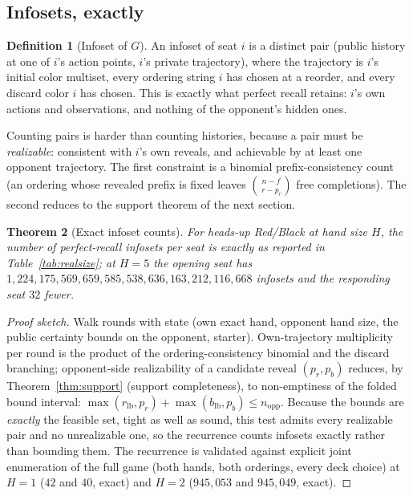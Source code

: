 \documentclass[11pt]{article}
\theoremstyle{plain}
\newtheorem{theorem}{Theorem}[section]
\theoremstyle{definition}
\newtheorem{definition}[theorem]{Definition}
\theoremstyle{remark}
\newcommand{\rlb}{\ensuremath{r_{\mathrm{lb}}}}
\newcommand{\blb}{\ensuremath{b_{\mathrm{lb}}}}
\begin{document}
\subsection{Infosets, exactly}

\begin{definition}[Infoset of $G$]\label{def:infoset}
An infoset of seat $i$ is a distinct pair (public history at one of $i$'s
action points, $i$'s private trajectory), where the trajectory is $i$'s
initial color multiset, every ordering string $i$ has chosen at a reorder,
and every discard color $i$ has chosen. This is exactly what perfect recall
retains: $i$'s own actions and observations, and nothing of the
opponent's hidden ones.
\end{definition}

Counting pairs is harder than counting histories, because a pair must be
\emph{realizable}: consistent with $i$'s own reveals, and achievable by at
least one opponent trajectory. The first constraint is a binomial
prefix-consistency count (an ordering whose revealed prefix is fixed leaves
$\binom{n-f}{\,r-p_r}$ free completions). The second reduces to the support
theorem of the next section.

\begin{theorem}[Exact infoset counts]\label{thm:infosets}
For heads-up Red/Black at hand size $H$, the number of perfect-recall
infosets per seat is exactly as reported in Table~\ref{tab:realsize}; at
$H=5$ the opening seat has
$1{,}224{,}175{,}569{,}659{,}585{,}538{,}636{,}163{,}212{,}116{,}668$
infosets and the responding seat $32$ fewer.
\end{theorem}

\begin{proof}[Proof sketch]
Walk rounds with state (own exact hand, opponent hand size, the public
certainty bounds on the opponent, starter). Own-trajectory multiplicity
per round is the product of the ordering-consistency binomial and the
discard branching; opponent-side realizability of a candidate reveal
$(p_r,p_b)$ reduces, by Theorem~\ref{thm:support} (support completeness),
to non-emptiness of the folded bound interval:
$\max(\rlb,p_r)+\max(\blb,p_b)\le n_{\mathrm{opp}}$. Because the bounds
are \emph{exactly} the feasible set, tight as well as sound, this test
admits every realizable pair and no unrealizable one, so the recurrence
counts infosets exactly rather than bounding them. The recurrence is
validated against explicit joint enumeration of the full game (both hands,
both orderings, every deck choice) at $H=1$ ($42$ and $40$, exact) and
$H=2$ ($945{,}053$ and $945{,}049$, exact).
\end{proof}
\end{document}

